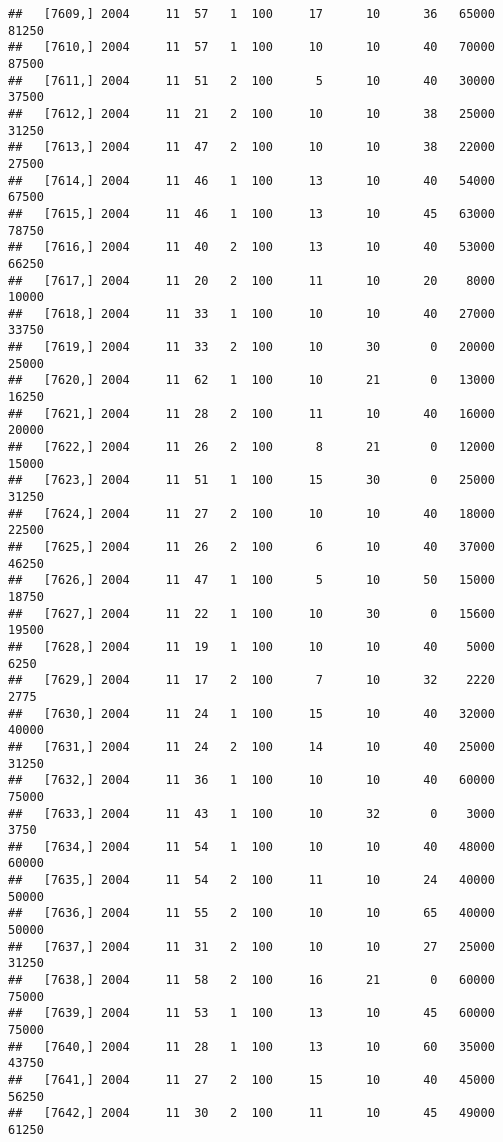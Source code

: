 \documentclass{article}\usepackage[]{graphicx}\usepackage[]{color}
\makeatletter
\newenvironment{kframe}{%
 \def\at@end@of@kframe{}%
 \ifinner\ifhmode%
  \def\at@end@of@kframe{\end{minipage}}%
  \begin{minipage}{\columnwidth}%
 \fi\fi%
 \def\FrameCommand##1{\hskip\@totalleftmargin \hskip-\fboxsep
 \colorbox{shadecolor}{##1}\hskip-\fboxsep
     \hskip-\linewidth \hskip-\@totalleftmargin \hskip\columnwidth}%
 \MakeFramed {\advance\hsize-\width
   \@totalleftmargin\z@ \linewidth\hsize
   \@setminipage}}%
 {\par\unskip\endMakeFramed%
 \at@end@of@kframe}
\newenvironment{knitrout}{}{} %
\makeatother
\begin{document}
\begin{knitrout}
\begin{kframe}
\begin{verbatim}
##   [7609,] 2004     11  57   1  100     17      10      36   65000   81250
##   [7610,] 2004     11  57   1  100     10      10      40   70000   87500
##   [7611,] 2004     11  51   2  100      5      10      40   30000   37500
##   [7612,] 2004     11  21   2  100     10      10      38   25000   31250
##   [7613,] 2004     11  47   2  100     10      10      38   22000   27500
##   [7614,] 2004     11  46   1  100     13      10      40   54000   67500
##   [7615,] 2004     11  46   1  100     13      10      45   63000   78750
##   [7616,] 2004     11  40   2  100     13      10      40   53000   66250
##   [7617,] 2004     11  20   2  100     11      10      20    8000   10000
##   [7618,] 2004     11  33   1  100     10      10      40   27000   33750
##   [7619,] 2004     11  33   2  100     10      30       0   20000   25000
##   [7620,] 2004     11  62   1  100     10      21       0   13000   16250
##   [7621,] 2004     11  28   2  100     11      10      40   16000   20000
##   [7622,] 2004     11  26   2  100      8      21       0   12000   15000
##   [7623,] 2004     11  51   1  100     15      30       0   25000   31250
##   [7624,] 2004     11  27   2  100     10      10      40   18000   22500
##   [7625,] 2004     11  26   2  100      6      10      40   37000   46250
##   [7626,] 2004     11  47   1  100      5      10      50   15000   18750
##   [7627,] 2004     11  22   1  100     10      30       0   15600   19500
##   [7628,] 2004     11  19   1  100     10      10      40    5000    6250
##   [7629,] 2004     11  17   2  100      7      10      32    2220    2775
##   [7630,] 2004     11  24   1  100     15      10      40   32000   40000
##   [7631,] 2004     11  24   2  100     14      10      40   25000   31250
##   [7632,] 2004     11  36   1  100     10      10      40   60000   75000
##   [7633,] 2004     11  43   1  100     10      32       0    3000    3750
##   [7634,] 2004     11  54   1  100     10      10      40   48000   60000
##   [7635,] 2004     11  54   2  100     11      10      24   40000   50000
##   [7636,] 2004     11  55   2  100     10      10      65   40000   50000
##   [7637,] 2004     11  31   2  100     10      10      27   25000   31250
##   [7638,] 2004     11  58   2  100     16      21       0   60000   75000
##   [7639,] 2004     11  53   1  100     13      10      45   60000   75000
##   [7640,] 2004     11  28   1  100     13      10      60   35000   43750
##   [7641,] 2004     11  27   2  100     15      10      40   45000   56250
##   [7642,] 2004     11  30   2  100     11      10      45   49000   61250

\end{verbatim}
\end{kframe}
\end{knitrout}
\end{document}
